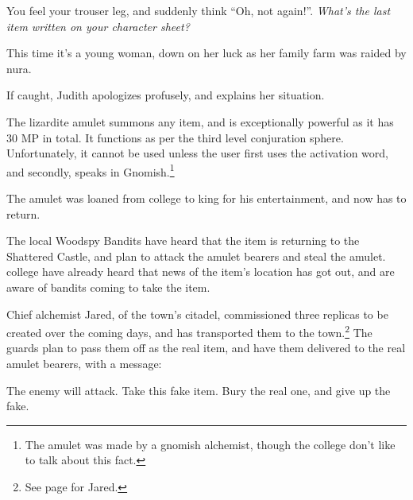 \begin{multicols}{2}
\begin{boxtext}

	You feel your trouser leg, and suddenly think ``Oh, not again!''.  \textit{What's the last item written on your character sheet?}

\end{boxtext}

This time it's a young woman, down on her luck as her family farm was raided by nura.

If caught, Judith apologizes profusely, and explains her situation.


\humanthief

\resumecontents[Villages]
\label{lizardite}
\stopcontents[Villages]

\startcontents[sq]

\sqminitoc

The lizardite amulet summons any item, and is exceptionally powerful as it has 30 MP in total.  It functions as per the third level conjuration sphere.  Unfortunately, it cannot be used unless the user first uses the activation word, and secondly, speaks in Gnomish.\footnote{The amulet was made by a gnomish alchemist, though the college don't like to talk about this fact.}

The amulet was loaned from \gls{college} to \gls{king} for his entertainment, and now has to return.


The local Woodspy Bandits have heard that the item is returning to the Shattered Castle, and plan to attack the amulet bearers and steal the amulet.
\Gls{college} have already heard that news of the item's location has got out, and are aware of bandits coming to take the item.

Chief alchemist Jared, of the town's citadel, commissioned three replicas to be created over the coming days, and has transported them to the town.\footnote{See page \pageref{citadel_alchemist} for Jared.}
The guards plan to pass them off as the real item, and have them delivered to the real amulet bearers, with a message:

\begin{boxtext}

	The enemy will attack.
	Take this fake item.
	Bury the real one, and give up the fake.


\end{boxtext}
\end{multicols}
